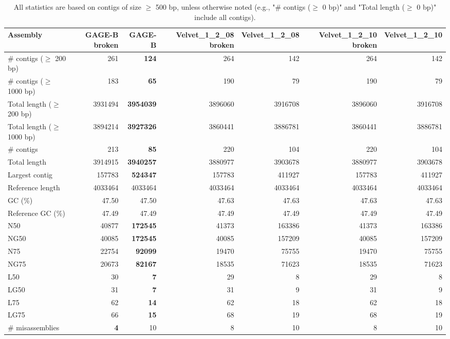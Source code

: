 \documentclass[12pt,a4paper]{article}
\begin{document}
\begin{table}[ht]
\begin{center}
\caption{All statistics are based on contigs of size $\geq$ 500 bp, unless otherwise noted (e.g., "\# contigs ($\geq$ 0 bp)" and "Total length ($\geq$ 0 bp)" include all contigs).}
\begin{tabular}{|l*{6}{|r}|}
\hline
Assembly & GAGE-B broken & GAGE-B & Velvet\_1\_2\_08 broken & Velvet\_1\_2\_08 & Velvet\_1\_2\_10 broken & Velvet\_1\_2\_10 \\ \hline
\# contigs ($\geq$ 200 bp) & 261 & {\bf 124} & 264 & 142 & 264 & 142 \\ \hline
\# contigs ($\geq$ 1000 bp) & 183 & {\bf 65} & 190 & 79 & 190 & 79 \\ \hline
Total length ($\geq$ 200 bp) & 3931494 & {\bf 3954039} & 3896060 & 3916708 & 3896060 & 3916708 \\ \hline
Total length ($\geq$ 1000 bp) & 3894214 & {\bf 3927326} & 3860441 & 3886781 & 3860441 & 3886781 \\ \hline
\# contigs & 213 & {\bf 85} & 220 & 104 & 220 & 104 \\ \hline
Total length & 3914915 & {\bf 3940257} & 3880977 & 3903678 & 3880977 & 3903678 \\ \hline
Largest contig & 157783 & {\bf 524347} & 157783 & 411927 & 157783 & 411927 \\ \hline
Reference length & 4033464 & 4033464 & 4033464 & 4033464 & 4033464 & 4033464 \\ \hline
GC (\%) & 47.50 & 47.50 & 47.63 & 47.63 & 47.63 & 47.63 \\ \hline
Reference GC (\%) & 47.49 & 47.49 & 47.49 & 47.49 & 47.49 & 47.49 \\ \hline
N50 & 40877 & {\bf 172545} & 41373 & 163386 & 41373 & 163386 \\ \hline
NG50 & 40085 & {\bf 172545} & 40085 & 157209 & 40085 & 157209 \\ \hline
N75 & 22754 & {\bf 92099} & 19470 & 75755 & 19470 & 75755 \\ \hline
NG75 & 20673 & {\bf 82167} & 18535 & 71623 & 18535 & 71623 \\ \hline
L50 & 30 & {\bf 7} & 29 & 8 & 29 & 8 \\ \hline
LG50 & 31 & {\bf 7} & 31 & 9 & 31 & 9 \\ \hline
L75 & 62 & {\bf 14} & 62 & 18 & 62 & 18 \\ \hline
LG75 & 66 & {\bf 15} & 68 & 19 & 68 & 19 \\ \hline
\# misassemblies & {\bf 4} & 10 & 8 & 10 & 8 & 10 \\ \hline

\end{tabular}
\end{center}
\end{table}
\end{document}
